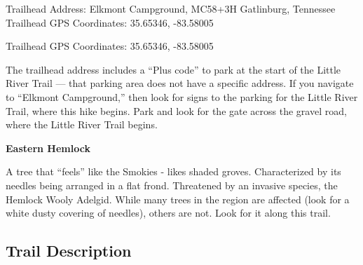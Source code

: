 \documentclass[
  letterpaper,
  DIV=11,
  numbers=noendperiod]{scrreprt}
\begin{document}
Trailhead Address: Elkmont Campground, MC58+3H Gatlinburg, Tennessee
Trailhead GPS Coordinates: 35.65346, -83.58005

Trailhead GPS Coordinates: 35.65346, -83.58005

The trailhead address includes a ``Plus code'' to park at the start of
the Little River Trail --- that parking area does not have a specific
address. If you navigate to ``Elkmont Campground,'' then look for signs
to the parking for the Little River Trail, where this hike begins. Park
and look for the gate across the gravel road, where the Little River
Trail begins.

\begin{tcolorbox}[enhanced jigsaw, opacityback=0, bottomrule=.15mm, colframe=quarto-callout-note-color-frame, breakable, arc=.35mm, leftrule=.75mm, rightrule=.15mm, toprule=.15mm, left=2mm, colback=white]
\begin{minipage}[t]{5.5mm}
\textcolor{quarto-callout-note-color}{\faInfo}
\end{minipage}%
\begin{minipage}[t]{\textwidth - 5.5mm}

\vspace{-3mm}\textbf{Eastern Hemlock}\vspace{3mm}

A tree that ``feels'' like the Smokies - likes shaded groves.
Characterized by its needles being arranged in a flat frond. Threatened
by an invasive species, the Hemlock Wooly Adelgid. While many trees in
the region are affected (look for a white dusty covering of needles),
others are not. Look for it along this trail.

\end{minipage}%
\end{tcolorbox}

\subsection{Trail Description}\label{trail-description-20}
\end{document}
